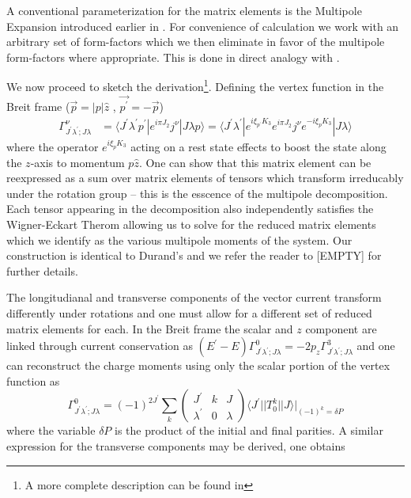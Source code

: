  
A conventional parameterization for the matrix elements is the Multipole Expansion introduced earlier in . For convenience of calculation we work with an arbitrary set of form-factors which we then eliminate in favor of the multipole form-factors where appropriate. This is done in direct analogy with .

We now proceed to sketch the derivation\footnote{A more complete description can be found in }. Defining the vertex function in the Breit frame ($\vec{p} = |p|\hat{z}$ , $\vec{p^\prime} = -\vec{p}$) 
\begin{align*}
\Gamma_{J^\prime\lambda^\prime;J\lambda}^\nu &= \langle J^\prime \lambda^\prime p^\prime | e^{i \pi J_2} j^\nu | J \lambda  p\rangle = \langle J^\prime \lambda^\prime| e^{i\xi_{p^\prime} K_3} e^{i \pi J_2} j^\nu e^{-i\xi_p K_3}  | J \lambda  \rangle
\end{align*}
where the operator $e^{i\xi_p K_3}$ acting on a rest state effects to boost the state along the $z$-axis to momentum $p\hat{z}$. One can show that this matrix element can be reexpressed as a sum over matrix elements of tensors which transform irreducably under the rotation group -- this is the esscence of the multipole decomposition. Each tensor appearing in the decomposition also independently satisfies the Wigner-Eckart Therom allowing us to solve for the reduced matrix elements which we identify as the various multipole moments of the system. Our construction is identical to Durand's and we refer the reader to [EMPTY] for further details. 

The longitudianal and transverse components of the vector current transform differently under rotations and one must allow for a different set of reduced matrix elements for each. In the Breit frame the scalar and $z$ component are linked through current conservation as $(E^\prime - E ) \Gamma_{J^\prime\lambda^\prime;J\lambda}^0 = -2p_z \Gamma_{J^\prime\lambda^\prime;J\lambda}^3$ and one can reconstruct the charge moments using only the scalar portion of the vertex function as
\begin{equation}
 \Gamma_{J^\prime\lambda^\prime;J\lambda}^0 = \left(-1\right)^{2J^\prime} \sum_k \begin{pmatrix} 
 J^\prime & k & J \\
 \lambda^\prime & 0 & \lambda 
 \end{pmatrix} \langle J^\prime || T^k_0 || J \rangle  \bigg|_{(-1)^k = \delta P}
\end{equation}
where the variable $\delta P$ is the product of the initial and final parities. A similar expression for the transverse components may be derived, one obtains 

